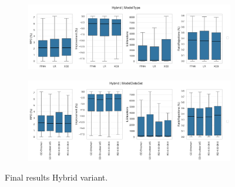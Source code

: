 \begin{figure}[!ht]
	\centering
	\begin{subfigure}[t]{\textwidth}
		\centering
		\includegraphics[width=0.9\linewidth]{pictures/final_results/ModelType_Hybrid_boxplot_final_results.png}
	\end{subfigure}
	\begin{subfigure}[t]{\textwidth}
		\centering
		\includegraphics[width=0.9\linewidth]{pictures/final_results/ModelDataSet_Hybrid_boxplot_final_results.png}
	\end{subfigure}
	\caption{Final results Hybrid variant.}
	\label{fig:final_results_hybrid_variant}
\end{figure}



